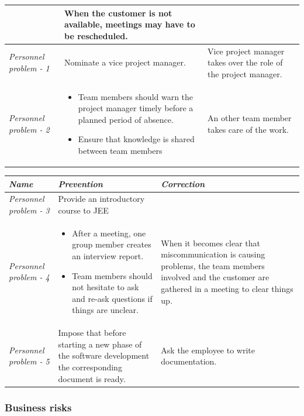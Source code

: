 \begin{landscape}
\begin{tabular}{>{\raggedright}p{4cm}|>{\raggedright}p{10cm}|>{\raggedright}p{8cm}}
 & {\small{}When the customer is not available, meetings may have to
be rescheduled. }\tabularnewline
\hline 
\emph{Personnel problem - 1} & {\small{}Nominate a vice project manager.} & {\small{}Vice project manager takes over the role of the project manager.}\tabularnewline
\hline 
\emph{Personnel problem - 2} & \begin{itemize}
\item {\small{}Team members should warn the project manager timely before
a planned period of absence.}{\small \par}
\item {\small{}Ensure that knowledge is shared between team members}\end{itemize}
 & {\small{}An other team member takes care of the work.}\tabularnewline
\hline 
\end{tabular}

\begin{tabular}{>{\raggedright}p{4cm}|>{\raggedright}p{10cm}|>{\raggedright}p{8cm}}
\hline 
\emph{Name} & \emph{Prevention} & \emph{Correction}\tabularnewline
\hline 
\hline 
\emph{Personnel problem - 3} & {\small{}Provide an introductory course to JEE} & \tabularnewline
\hline 
\emph{Personnel problem - 4} & \begin{itemize}
\item {\small{}After a meeting, one group member creates an interview report. }{\small \par}
\item {\small{}Team members should not hesitate to ask and re-ask questions
if things are unclear.}\end{itemize}
 & {\small{}When it becomes clear that miscommunication is causing problems,
the team members involved and the customer are gathered in a meeting
to clear things up.}\tabularnewline
\hline 
\emph{Personnel problem - 5} & {\small{}Impose that before starting a new phase of the software development
the corresponding document is ready.} & {\small{}Ask the employee to write documentation.}\tabularnewline
\hline 
\end{tabular}

\medskip{}



\subsubsection{Business risks}

\medskip{}



\end{landscape}
